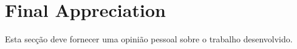 \section{Final Appreciation} %
\label{sec:appreciation}

Esta secção deve fornecer uma opinião pessoal sobre o trabalho desenvolvido.

